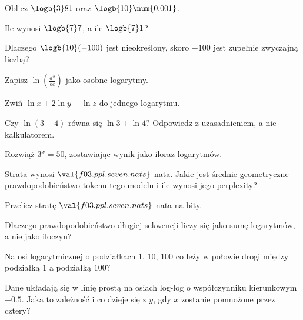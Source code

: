 \begin{testexercises}
\item Oblicz $\logb{3} 81$ oraz $\logb{10} \num{0.001}$.
\item Ile wynosi $\logb{7} 7$, a ile $\logb{7} 1$?
\item Dlaczego $\logb{10}(-100)$ jest nieokreślony, skoro $-100$ jest zupełnie
  zwyczajną liczbą?
\item Zapisz $\ln\!\left(\frac{a^{3}}{bc}\right)$ jako osobne logarytmy.
\item Zwiń $\ln x + 2\ln y - \ln z$ do jednego logarytmu.
\item Czy $\ln(3 + 4)$ równa się $\ln 3 + \ln 4$? Odpowiedz z uzasadnieniem, a
  nie kalkulatorem.
\item Rozwiąż $3^{x} = 50$, zostawiając wynik jako iloraz logarytmów.
\item Strata wynosi $\val{f03.ppl.seven.nats}$ nata. Jakie jest średnie
  geometryczne prawdopodobieństwo tokenu tego modelu i ile wynosi jego
  perplexity?
\item Przelicz stratę $\val{f03.ppl.seven.nats}$ nata na bity.
\item Dlaczego prawdopodobieństwo długiej sekwencji liczy się jako sumę
  logarytmów, a nie jako iloczyn?
\item Na osi logarytmicznej o podziałkach $1$, $10$, $100$ \dash{} co leży w
  połowie drogi między podziałką $1$ a podziałką $100$?
\item Dane układają się w linię prostą na osiach log-log o współczynniku
  kierunkowym $-\num{0.5}$. Jaka to zależność i co dzieje się z $y$, gdy $x$
  zostanie pomnożone przez cztery?
\end{testexercises}

